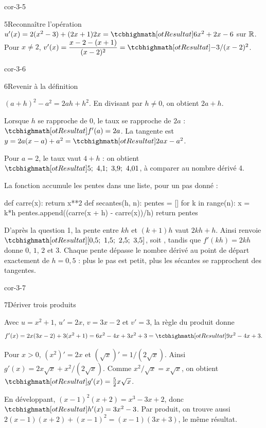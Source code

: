 \begin{blocLivre}{cor-3-5}
\begin{corrige}{5}{Reconnaître l'opération}
$u'(x)=2(x^2-3)+(2x+1)2x=\res{6x^2+2x-6}$ sur $\mathbb{R}$.
Pour $x\neq2$, $v'(x)=\dfrac{x-2-(x+1)}{(x-2)^2}=\res{-3/(x-2)^2}$.
\end{corrige}
\end{blocLivre}
\begin{blocLivre}{cor-3-6}
\begin{corrige}{6}{Revenir à la définition}
\begin{questions}
\item $(a+h)^2-a^2=2ah+h^2$. En divisant par $h\neq0$, on obtient $2a+h$.
\item Lorsque $h$ se rapproche de 0, le taux se rapproche de $2a$ :
$\res{f'(a)=2a}$. La tangente est $y=2a(x-a)+a^2=\res{2ax-a^2}$.
\item Pour $a=2$, le taux vaut $4+h$ : on obtient
$\res{5;\ 4{,}1;\ 3{,}9;\ 4{,}01}$, à comparer au nombre dérivé 4.
\item La fonction accumule les pentes dans une liste, pour un pas donné :
\end{questions}
\begin{python}
def carre(x):
    return x**2
def secantes(h, n):
    pentes = []
    for k in range(n):
        x = k*h
        pentes.append((carre(x + h) - carre(x))/h)
    return pentes
\end{python}
D'après la question 1, la pente entre $kh$ et $(k+1)h$ vaut $2kh+h$.
Ainsi  renvoie $\res{[0{,}5;\ 1{,}5;\ 2{,}5;\ 3{,}5]}$, soit
\code{[0.5, 1.5, 2.5, 3.5]}, tandis que $f'(kh)=2kh$ donne $0$, $1$, $2$ et $3$.
Chaque pente dépasse le nombre dérivé au point de départ exactement de $h=0{,}5$ :
plus le pas est petit, plus les sécantes se rapprochent des tangentes.
\end{corrige}
\end{blocLivre}
\begin{blocLivre}{cor-3-7}
\begin{corrige}{7}{Dériver trois produits}
\begin{questions}
\item Avec $u=x^2+1$, $u'=2x$, $v=3x-2$ et $v'=3$, la règle du produit donne
\[f'(x)=2x(3x-2)+3(x^2+1)=6x^2-4x+3x^2+3=\res{9x^2-4x+3}.\]
\item Pour $x>0$, $(x^2)'=2x$ et $(\sqrt x)'=1/(2\sqrt x)$.
Ainsi $g'(x)=2x\sqrt x+x^2/(2\sqrt x)$. Comme $x^2/\sqrt x=x\sqrt x$,
on obtient $\res{g'(x)=\frac52x\sqrt x}$.
\item En développant, $(x-1)^2(x+2)=x^3-3x+2$, donc $\res{h'(x)=3x^2-3}$.
Par produit, on trouve aussi $2(x-1)(x+2)+(x-1)^2=(x-1)(3x+3)$, le même résultat.
\end{questions}

\end{corrige}
\end{blocLivre}
